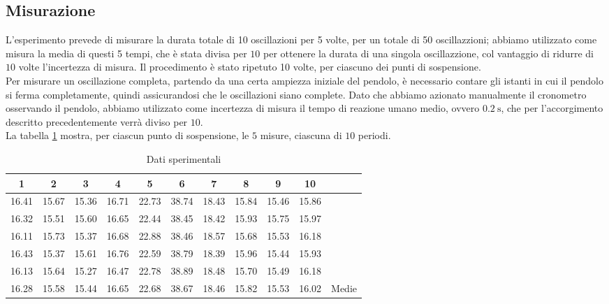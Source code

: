 \documentclass[a4paper]{article}
\begin{document}
    \subsection{Misurazione}
    L'esperimento prevede di misurare la durata totale di 10 oscillazioni per 5 volte, per un totale di 50 oscillazzioni;
    abbiamo utilizzato come misura la media di questi 5 tempi, che è stata divisa per $10$ per ottenere la durata
    di una singola oscillazzione, col vantaggio di ridurre di $10$ volte l'incertezza di misura.
    Il procedimento è stato ripetuto 10 volte, per ciascuno dei punti di sospensione.\\
    Per misurare un oscillazione completa, partendo da una certa ampiezza iniziale del pendolo, è necessario contare gli istanti in cui il pendolo si ferma completamente, quindi assicurandosi che le oscillazioni siano complete.
    Dato che abbiamo azionato manualmente il cronometro osservando il pendolo, abbiamo
    utilizzato come incertezza di misura il tempo di reazione umano medio, ovvero $\SI{0.2}{\s}$,
    che per l'accorgimento descritto precedentemente verrà diviso per $10$.\\
    La tabella \ref{tab:dati} mostra, per ciascun punto di sospensione, le $5$ misure,
    ciascuna di  $10$ periodi.
    
    \begin{table}[h!]
        \centering
        \begin{tabular}{|c|c|c|c|c|c|c|c|c|c||c|}
             \hline
             1 & 2 & 3 & 4 & 5 & 6 & 7 & 8 & 9 & 10 & \\ [0.3ex]
             \hline\hline
             16.41 & 15.67 & 15.36 & 16.71 & 22.73 & 38.74 & 18.43 & 15.84 & 15.46 & 15.86 & \\
             16.32 & 15.51 & 15.60 & 16.65 & 22.44 & 38.45 & 18.42 & 15.93 & 15.75 & 15.97 & \\
             16.11 & 15.73 & 15.37 & 16.68 & 22.88 & 38.46 & 18.57 & 15.68 & 15.53 & 16.18 & \\
             16.43 & 15.37 & 15.61 & 16.76 & 22.59 & 38.79 & 18.39 & 15.96 & 15.44 & 15.93 & \\
             16.13 & 15.64 & 15.27 & 16.47 & 22.78 & 38.89 & 18.48 & 15.70 & 15.49 & 16.18 & \\
             \hline
             16.28 & 15.58 & 15.44 & 16.65 & 22.68 & 38.67 & 18.46 & 15.82 & 15.53 & 16.02 & Medie\\ 
             \hline
        \end{tabular}
        \caption{Dati sperimentali}
        \label{tab:dati}
    \end{table}
\end{document}
